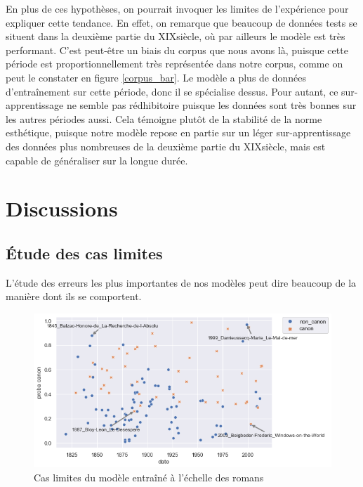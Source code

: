En plus de ces hypothèses, on pourrait invoquer les limites de l'expérience pour expliquer cette tendance. En effet, on remarque que beaucoup de données tests se situent dans la deuxième partie du XIX\ieme siècle, où par ailleurs le modèle est très performant. C'est peut-être un biais du corpus que nous avons là, puisque cette période est proportionnellement très représentée dans notre corpus, comme on peut le constater en figure \ref{corpus_bar}. Le modèle a plus de données d'entraînement sur cette période, donc il se spécialise dessus. Pour autant, ce sur-apprentissage ne semble pas rédhibitoire puisque les données sont très bonnes sur les autres périodes aussi. Cela témoigne plutôt de la stabilité de la norme esthétique, puisque notre modèle repose en partie sur un léger sur-apprentissage des données plus nombreuses de la deuxième partie du XIX\ieme siècle, mais est capable de généraliser sur la longue durée.


\chapter{Discussions}

\section{Étude des cas limites}

L'étude des erreurs les plus importantes de nos modèles peut dire beaucoup de la manière dont ils se comportent. 

\begin{figure}[!ht]
    \centering
    \includegraphics[width=15cm]{img/10_outliers_main_results.png}
    \caption{Cas limites du modèle entraîné à l'échelle des romans}
    \label{outlier_novel}
\end{figure}

